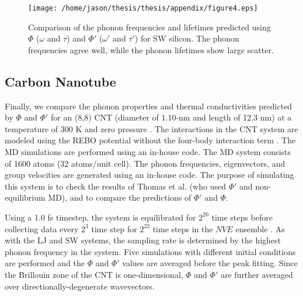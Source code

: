 \vspace*{1mm}
\begin{figure}
\begin{center}
\texttt{[image: /home/jason/thesis/thesis/appendix/figure4.eps]}
\vspace*{0mm}
\end{center}
\caption{\label{F:FREQ_LIFE_Si} Comparison of the phonon frequencies and 
lifetimes predicted 
using $\Phi$ ($\omega$ and $\tau$) and  $\Phi'$ ($\omega'$ and $\tau'$) 
for SW silicon. The 
phonon frequencies agree well, while the phonon lifetimes show large 
scatter.}
\end{figure}
\clearpage
\subsection{\label{S:Subsection_prop_CNT}Carbon Nanotube}
Finally, we compare the phonon properties and thermal conductivities 
predicted by $\Phi$ and 
$\Phi'$ for an (8,8) CNT (diameter of 1.10-nm and length of 12.3 nm) at 
a temperature of $300$ K 
and zero pressure \cite{thomas_predicting_2010}. 
The interactions in the CNT system 
are modeled using the 
REBO potential without the four-body interaction term 
\cite{brenner_second_2002}. 
The MD simulations are 
performed using an in-house code. The MD system consists of 1600 atoms 
(32 atoms/unit cell). The 
phonon frequencies, eigenvectors, and group velocities are generated using 
an in-house code. The 
purpose of simulating this system is to check the results of Thomas et al.
\cite{thomas_predicting_2010} (who 
used $\Phi'$ and non-equilibrium MD), and to compare the predictions of 
$\Phi'$ and $\Phi$.

Using a 1.0 fs timestep, the system is equilibrated for $2^{20}$ time 
steps before collecting data 
every $2^3$ time step for $2^{22}$ time steps in the $NVE$ ensemble 
\cite{mcquarrie_statistical_2000}. As with 
the LJ and SW systems, the sampling rate is determined by the highest 
phonon frequency in the 
system. Five simulations with different initial conditions are performed 
and the $\Phi$ and $\Phi'$ 
values are averaged before the peak fitting. Since the Brillouin zone of 
the CNT is 
one-dimensional, $\Phi$ and $\Phi'$ are further averaged over 
directionally-degenerate wavevectors.


